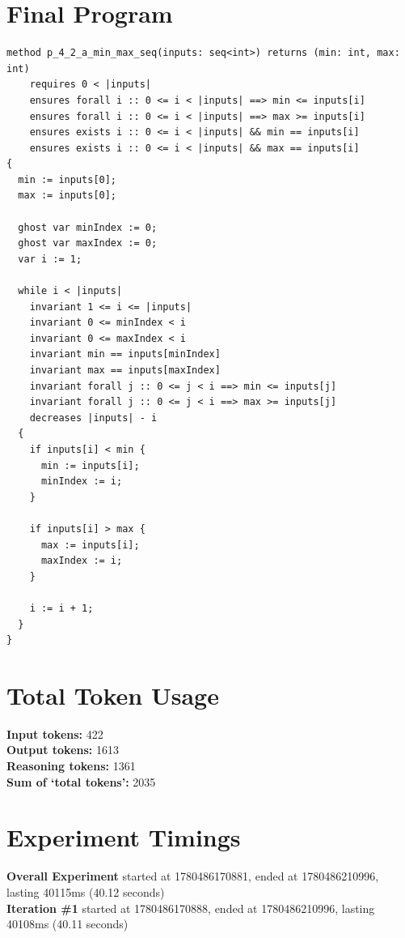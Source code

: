 \documentclass{article}
\begin{document}
\section*{Final Program}
\begin{lstlisting}
method p_4_2_a_min_max_seq(inputs: seq<int>) returns (min: int, max: int)
	requires 0 < |inputs|
	ensures forall i :: 0 <= i < |inputs| ==> min <= inputs[i]
	ensures forall i :: 0 <= i < |inputs| ==> max >= inputs[i]
	ensures exists i :: 0 <= i < |inputs| && min == inputs[i]
	ensures exists i :: 0 <= i < |inputs| && max == inputs[i]
{
  min := inputs[0];
  max := inputs[0];

  ghost var minIndex := 0;
  ghost var maxIndex := 0;
  var i := 1;

  while i < |inputs|
    invariant 1 <= i <= |inputs|
    invariant 0 <= minIndex < i
    invariant 0 <= maxIndex < i
    invariant min == inputs[minIndex]
    invariant max == inputs[maxIndex]
    invariant forall j :: 0 <= j < i ==> min <= inputs[j]
    invariant forall j :: 0 <= j < i ==> max >= inputs[j]
    decreases |inputs| - i
  {
    if inputs[i] < min {
      min := inputs[i];
      minIndex := i;
    }

    if inputs[i] > max {
      max := inputs[i];
      maxIndex := i;
    }

    i := i + 1;
  }
}
\end{lstlisting}
\section*{Total Token Usage}
\textbf{Input tokens: }422
\\\textbf{Output tokens: }1613
\\\textbf{Reasoning tokens: }1361
\\\textbf{Sum of `total tokens': }2035
\section*{Experiment Timings}
\textbf{Overall Experiment} started at 1780486170881, ended at 1780486210996, lasting 40115ms (40.12 seconds)
\\\textbf{Iteration \#1} started at 1780486170888, ended at 1780486210996, lasting 40108ms (40.11 seconds)
\end{document}
